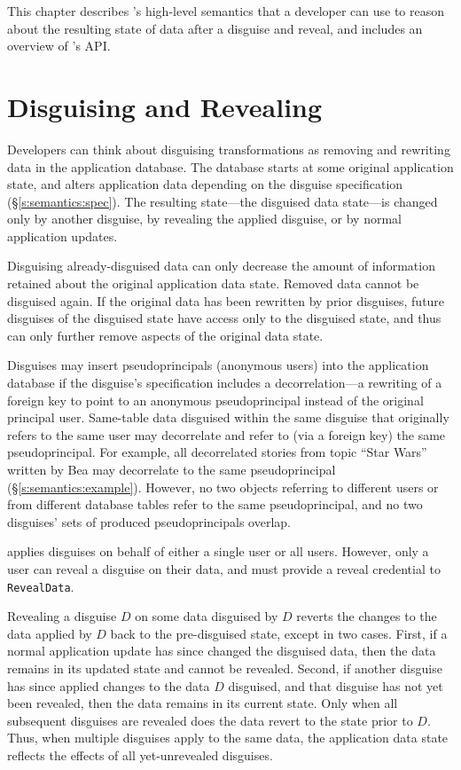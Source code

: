 This chapter describes \sys's high-level semantics that a developer can use to
reason about the resulting state of data after a disguise and reveal, and 
includes an overview of \sys's API.

\section{Disguising and Revealing}
\label{s:semantics:hl}
Developers can think about disguising transformations as removing and rewriting
data in the application database.
%
The database starts at some original application state, and alters application
data depending on the disguise specification (\S\ref{s:semantics:spec}).  The
resulting state---the disguised data state---is changed only by another
disguise, by revealing the applied disguise, or by normal application updates.
%

%
Disguising already-disguised data can only decrease the amount of information
retained about the original application data state. Removed data cannot be
disguised again. If the original data has been rewritten by prior disguises,
future disguises of the disguised state have access only to the disguised state,
and thus can only further remove aspects of the original data state.
%

Disguises may insert pseudoprincipals (anonymous users) into the application
database if the disguise's specification includes a decorrelation---a rewriting
of a foreign key to point to an anonymous pseudoprincipal instead of the
original principal user. 
%
Same-table data disguised within the same disguise that originally refers to the
same user may decorrelate and refer to (via a foreign key) the same
pseudoprincipal.
%
For example, all decorrelated stories from topic ``Star Wars'' written by Bea
may decorrelate to the same pseudoprincipal (\S\ref{s:semantics:example}).
%
However, no two objects referring to different users or from different database
tables refer to the same pseudoprincipal, and no two disguises' sets of produced
pseudoprincipals overlap.
%

%
\sys applies disguises on behalf of either a single user or all users. However,
only a user can reveal a disguise on their data, and must provide a reveal
credential to \texttt{RevealData}.
%

%
Revealing a disguise $D$ on some data disguised by $D$ reverts the changes to
the data applied by $D$ back to the pre-disguised state, except in two cases.
First, if a normal application update has since changed the disguised data, then
the data remains in its updated state and cannot be revealed.
%
Second, if another disguise has since applied changes to the data $D$ disguised,
and that disguise has not yet been revealed, then the data remains in its
current state.
%
Only when all subsequent disguises are revealed does the data revert to the
state prior to $D$.
%
Thus, when multiple disguises apply to the same data, the application data state
reflects the effects of all yet-unrevealed disguises.
%

